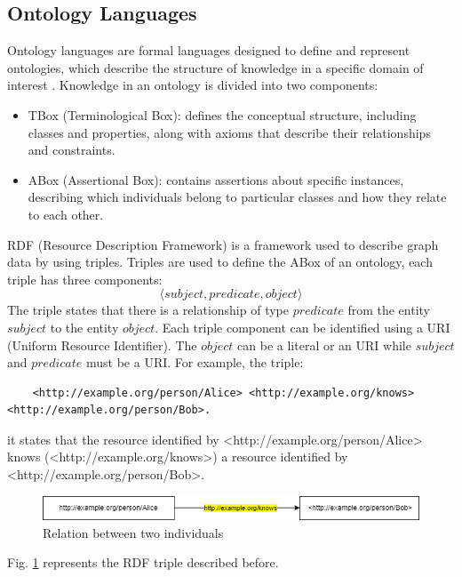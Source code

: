 \subsection{Ontology Languages}
Ontology languages are formal languages designed to define and represent ontologies, which describe the structure of knowledge in a specific domain of interest \cite{ontolang_wiki}.
Knowledge in an ontology is divided into two components:
\begin{itemize}
    \item TBox (Terminological Box): defines the conceptual structure, including classes and properties, along with axioms that describe their relationships and constraints.

    \item ABox (Assertional Box): contains assertions about specific instances, describing which individuals belong to particular classes and how they relate to each other.
\end{itemize}
RDF (Resource Description Framework) is a framework used to describe graph data by using triples. Triples are used to define the ABox of an ontology, each triple has three components: 
$$
\langle subject, predicate, object\rangle
$$
The triple states that there is a relationship of type $predicate$ from the entity $subject$ to the entity $object$. Each triple component can be identified using a URI (Uniform Resource Identifier). The $object$ can be a literal or an URI while $subject$ and $predicate$ must be a URI.
For example, the triple:
\begin{lstlisting}
    <http://example.org/person/Alice> <http://example.org/knows> <http://example.org/person/Bob>.
\end{lstlisting}
it states that the resource identified by <http://example.org/person/Alice> knows (<http://example.org/knows>) a resource identified by <http://example.org/person/Bob>.
\begin{figure}[H]
    \centering
    \includegraphics[width=0.9\linewidth]{Figures/fig_86.png}
    \caption{Relation between two individuals}
    \label{fig:86}
\end{figure}
Fig. \ref{fig:86} represents the RDF triple described before.

